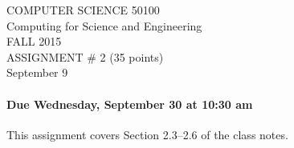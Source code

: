 \documentclass[11pt]{article}
\begin{document}
\begin{center}
{\Large COMPUTER SCIENCE 50100}\\
{\Large Computing for Science and Engineering} \\
{\large FALL 2015} \\
ASSIGNMENT \# 2 (35 points) \\
{\small September 9}
\end{center}

\paragraph{Due Wednesday, September 30 at 10:30 am}

This assignment covers Section 2.3--2.6 of the class notes.
\end{document}

